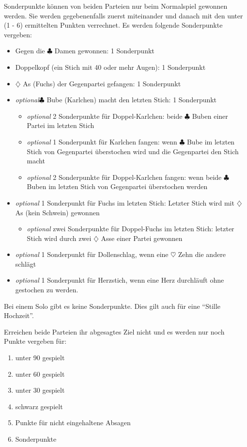\documentclass{scrartcl}
\newcommand{\kreuz}{$\clubsuit$\xspace}
\newcommand{\herz}{$\heartsuit$\xspace}
\newcommand{\karo}{$\diamondsuit$\xspace}
\newcommand{\optional}{\textit{optional}\xspace}
\begin{document}
Sonderpunkte können von beiden Parteien nur beim Normalspiel gewonnen werden.  Sie werden gegebenenfalls zuerst miteinander und danach mit den unter (1 - 6) ermittelten Punkten verrechnet.  Es werden folgende Sonderpunkte vergeben:
\begin{itemize}
  \item Gegen die \kreuz Damen gewonnen: 1 Sonderpunkt
  \item Doppelkopf (ein Stich mit 40 oder mehr Augen): 1 Sonderpunkt
  \item \karo As (Fuchs) der Gegenpartei gefangen: 1 Sonderpunkt
  \item \optional \kreuz Bube (Karlchen) macht den letzten Stich: 1 Sonderpunkt
    \begin{itemize}
      \item \optional 2 Sonderpunkte für Doppel-Karlchen: beide \kreuz Buben einer Partei im letzten Stich
      \item \optional 1 Sonderpunkt für Karlchen fangen: wenn \kreuz Bube im letzten Stich von Gegenpartei überstochen wird und
	die Gegenpartei den Stich macht
      \item \optional 2 Sonderpunkte für Doppel-Karlchen fangen: wenn beide \kreuz Buben im letzten Stich von Gegenpartei überstochen werden
    \end{itemize}
  \item \optional 1 Sonderpunkt für Fuchs im letzten Stich: Letzter Stich wird mit \karo As (kein Schwein) gewonnen
    \begin{itemize}
      \item \optional zwei Sonderpunkte für Doppel-Fuchs im letzten Stich: letzter Stich wird durch zwei \karo Asse einer Partei gewonnen
    \end{itemize}
  \item \optional 1 Sonderpunkt für Dollenschlag, wenn eine \herz Zehn die andere schlägt
  \item \optional 1 Sonderpunkt für Herzstich, wenn eine Herz
    durchläuft ohne gestochen zu werden.
\end{itemize}

Bei einem Solo gibt es keine Sonderpunkte. Dies gilt auch für eine "`Stille Hochzeit"'.

Erreichen beide Parteien ihr abgesagtes Ziel nicht und es werden nur noch Punkte vergeben für:
\begin{enumerate}
  \item unter 90 gespielt
  \item unter 60 gespielt
  \item unter 30 gespielt
  \item schwarz gespielt
  \item Punkte für nicht eingehaltene Absagen
  \item Sonderpunkte
\end{enumerate}
\end{document}
